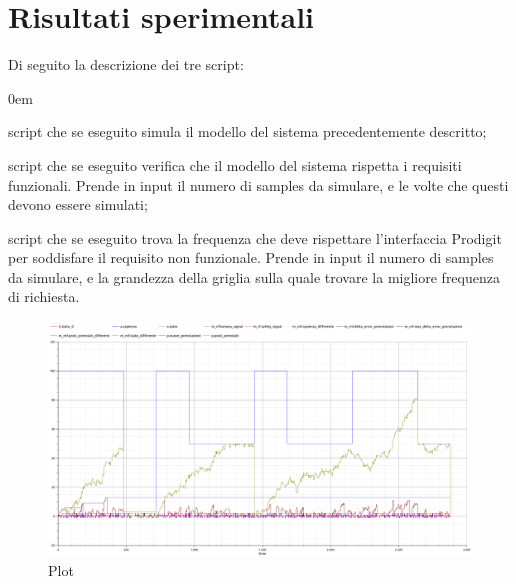 \documentclass[11pt]{article}
\begin{document}
	
	\newpage
	\section{Risultati sperimentali}
	Di seguito la descrizione dei tre script:
	\begin{description}
		\addtolength{\itemindent}{0.5cm}
		\itemsep0em
		\item [run.mos] script che se eseguito simula il modello del sistema precedentemente descritto;
		\item [verify.py] script che se eseguito verifica che il modello del sistema rispetta i requisiti funzionali. Prende in input il numero di samples da simulare, e le volte che questi devono essere simulati;
		\item [synth.py] script che se eseguito trova la frequenza che deve rispettare l'interfaccia Prodigit per soddisfare il requisito non funzionale. Prende in input il numero di samples da simulare, e la grandezza della griglia sulla quale trovare la migliore frequenza di richiesta.
	\end{description}
		
	\begin{figure}[H]
	\centering
	\includegraphics[width=1\textwidth]{Plot.png}
	\caption{Plot}
	\end{figure}
	
\end{document}
